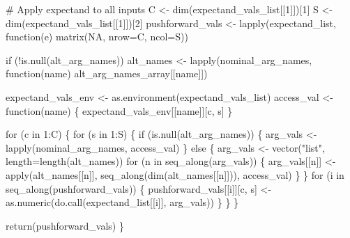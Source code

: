 \documentclass[
  letterpaper,
  DIV=11,
  numbers=noendperiod]{scrartcl}
\newenvironment{Shaded}{\begin{snugshade}}{\end{snugshade}}
\newcommand{\BuiltInTok}[1]{\textcolor[rgb]{0.00,0.23,0.31}{#1}}
\newcommand{\CommentTok}[1]{\textcolor[rgb]{0.37,0.37,0.37}{#1}}
\newcommand{\ControlFlowTok}[1]{\textcolor[rgb]{0.00,0.23,0.31}{#1}}
\newcommand{\DecValTok}[1]{\textcolor[rgb]{0.68,0.00,0.00}{#1}}
\newcommand{\ImportTok}[1]{\textcolor[rgb]{0.00,0.46,0.62}{#1}}
\newcommand{\KeywordTok}[1]{\textcolor[rgb]{0.00,0.23,0.31}{#1}}
\newcommand{\NormalTok}[1]{\textcolor[rgb]{0.00,0.23,0.31}{#1}}
\newcommand{\OperatorTok}[1]{\textcolor[rgb]{0.37,0.37,0.37}{#1}}
\newcommand{\StringTok}[1]{\textcolor[rgb]{0.13,0.47,0.30}{#1}}
\begin{document}
\begin{Shaded}
\begin{Highlighting}[]
  \CommentTok{\# Apply expectand to all inputs}
\NormalTok{  C }\OperatorTok{\textless{}{-}}\NormalTok{ dim(expectand\_vals\_list[[}\DecValTok{1}\NormalTok{]])[}\DecValTok{1}\NormalTok{]}
\NormalTok{  S }\OperatorTok{\textless{}{-}}\NormalTok{ dim(expectand\_vals\_list[[}\DecValTok{1}\NormalTok{]])[}\DecValTok{2}\NormalTok{]}
\NormalTok{  pushforward\_vals }\OperatorTok{\textless{}{-}}\NormalTok{ lapply(expectand\_list,}
\NormalTok{                             function(e) matrix(NA, nrow}\OperatorTok{=}\NormalTok{C, ncol}\OperatorTok{=}\NormalTok{S))}

  \ControlFlowTok{if}\NormalTok{ (}\OperatorTok{!}\KeywordTok{is}\NormalTok{.null(alt\_arg\_names))}
\NormalTok{    alt\_names }\OperatorTok{\textless{}{-}}\NormalTok{ lapply(nominal\_arg\_names,}
\NormalTok{                        function(name) alt\_arg\_names\_array[[name]])}

\NormalTok{  expectand\_vals\_env }\OperatorTok{\textless{}{-}} \ImportTok{as}\NormalTok{.environment(expectand\_vals\_list)}
\NormalTok{  access\_val }\OperatorTok{\textless{}{-}}\NormalTok{ function(name) \{}
\NormalTok{    expectand\_vals\_env[[name]][c, s]}
\NormalTok{  \}}

  \ControlFlowTok{for}\NormalTok{ (c }\KeywordTok{in} \DecValTok{1}\NormalTok{:C) \{}
    \ControlFlowTok{for}\NormalTok{ (s }\KeywordTok{in} \DecValTok{1}\NormalTok{:S) \{}
      \ControlFlowTok{if}\NormalTok{ (}\KeywordTok{is}\NormalTok{.null(alt\_arg\_names)) \{}
\NormalTok{        arg\_vals }\OperatorTok{\textless{}{-}}\NormalTok{ lapply(nominal\_arg\_names, access\_val)}
\NormalTok{      \} }\ControlFlowTok{else}\NormalTok{ \{}
\NormalTok{        arg\_vals }\OperatorTok{\textless{}{-}}\NormalTok{ vector(}\StringTok{"list"}\NormalTok{, length}\OperatorTok{=}\NormalTok{length(alt\_names))}
        \ControlFlowTok{for}\NormalTok{ (n }\KeywordTok{in}\NormalTok{ seq\_along(arg\_vals)) \{}
\NormalTok{          arg\_vals[[n]] }\OperatorTok{\textless{}{-}} \BuiltInTok{apply}\NormalTok{(alt\_names[[n]],}
\NormalTok{                                 seq\_along(dim(alt\_names[[n]])),}
\NormalTok{                                 access\_val)}
\NormalTok{        \}}
\NormalTok{      \}}
      \ControlFlowTok{for}\NormalTok{ (i }\KeywordTok{in}\NormalTok{ seq\_along(pushforward\_vals)) \{}
\NormalTok{        pushforward\_vals[[i]][c, s] }\OperatorTok{\textless{}{-}}
          \ImportTok{as}\NormalTok{.numeric(do.call(expectand\_list[[i]], arg\_vals))}
\NormalTok{      \}}
\NormalTok{    \}}
\NormalTok{  \}}

  \ControlFlowTok{return}\NormalTok{(pushforward\_vals)}
\NormalTok{\}}
\end{Highlighting}
\end{Shaded}
\end{document}
